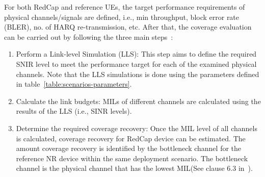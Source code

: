 \documentclass[]{IEEEtran}
\begin{document}
For both RedCap and reference UEs, the target performance requirements of physical channels/signals are defined, i.e., min throughput, block error rate (BLER), no. of HARQ re-transmission, etc. 
After that, the coverage evaluation can be carried out by following the three main steps~\cite{moloudi_coverage_2021}:
\begin{enumerate}
    \item  Perform a Link-level Simulation (LLS): This step aims to define the required SNIR level to meet the performance target for each of the examined physical channels.
    Note that the LLS simulations is done using the parameters defined in table~\ref{table:scenarios-parameters}.
    \item Calculate the link budgets: MILs of different channels are calculated using the results of the LLS (i.e., SINR levels).
    \item Determine the required coverage recovery: Once the MIL level of all channels is calculated, coverage recovery for RedCap device can be estimated.
    The amount coverage recovery is identified by the bottleneck channel for the reference NR device within the same deployment scenario.
    The bottleneck channel is the physical channel that has the lowest MIL(See clause 6.3 in~\cite{3gpp_study_2021_38.875}).
\end{enumerate}
\end{document}
